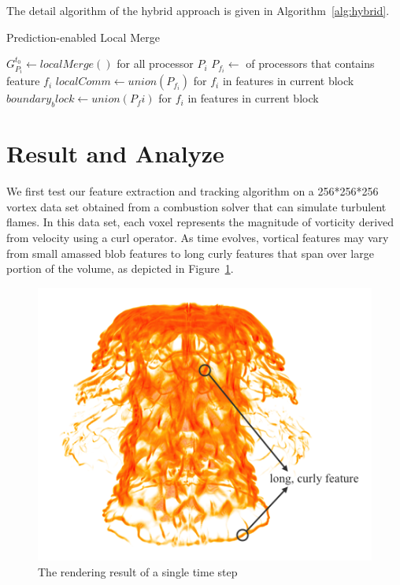 \documentclass[10pt, conference, compsocconf]{IEEEtran}
\begin{document}
The detail algorithm of the hybrid approach is given in Algorithm~\ref{alg:hybrid}.
\begin{algorithm}
\caption{Prediction-enabled Local Merge}
\label{alg:hybrid}
	\begin{algorithmic}[1]
			\STATE $G_{P_i}^{t_0} \leftarrow localMerge()$ for all processor $P_i$
			\STATE $P_{f_i} \leftarrow$ of processors that contains feature $f_i$
			\STATE $localComm \leftarrow union(P_{f_i})$ for $f_i$ in features in current block
		\ELSE
			\STATE $boundary_block \leftarrow union(P_fi)$ for $f_i$ in features in current block
		\ENDIF
	\end{algorithmic}
\end{algorithm}

\section{Result and Analyze}
We first test our feature extraction and tracking algorithm on a 256*256*256 vortex data set obtained from a combustion solver that can simulate turbulent flames. In this data set, each voxel represents the magnitude of vorticity derived from velocity using a curl operator. As time evolves, vortical features may vary from small amassed blob features to long curly features that span over large portion of the volume, as depicted in Figure~\ref{fig:combustion-labeled}.

\begin{figure}[!htp]
\includegraphics[width=0.9\linewidth]{combustion_labeled.png}
\caption{The rendering result of a single time step }
\label{fig:combustion-labeled}
\end{figure}
\end{document}
